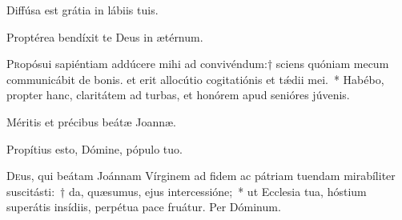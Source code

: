 \documentclass[vesperale_romanum.tex]{subfiles}
\begin{document}
\admagnificat


\vv Diffúsa est grátia in lábiis tuis.

\rr Proptérea bendíxit te Deus in ætérnum.

\quadcommferiae

\myrule











\lettrine{P}{r}opósui sapiéntiam addúcere mihi ad convivéndum:† sciens quóniam mecum communicábit de bonis. et erit allocútio cogitatiónis et tǽdii mei.~* Habébo, propter hanc, claritátem ad turbas, et honórem apud senióres júvenis.

\hymnus 


\vv Méritis et précibus beátæ Joannæ. \tpalleluia

\rr Propítius esto, Dómine, pópulo tuo. \tpalleluia

\admagnificat


\oratio

\lettrine{D}{e}us, qui beátam Joánnam Vírginem ad fidem ac pátriam tuendam mirabíliter suscitásti:~† da, quæsumus, ejus intercessióne;~* ut Ecclesia tua, hóstium superátis insídiis, perpétua pace fruátur. Per Dóminum.


\end{document}
